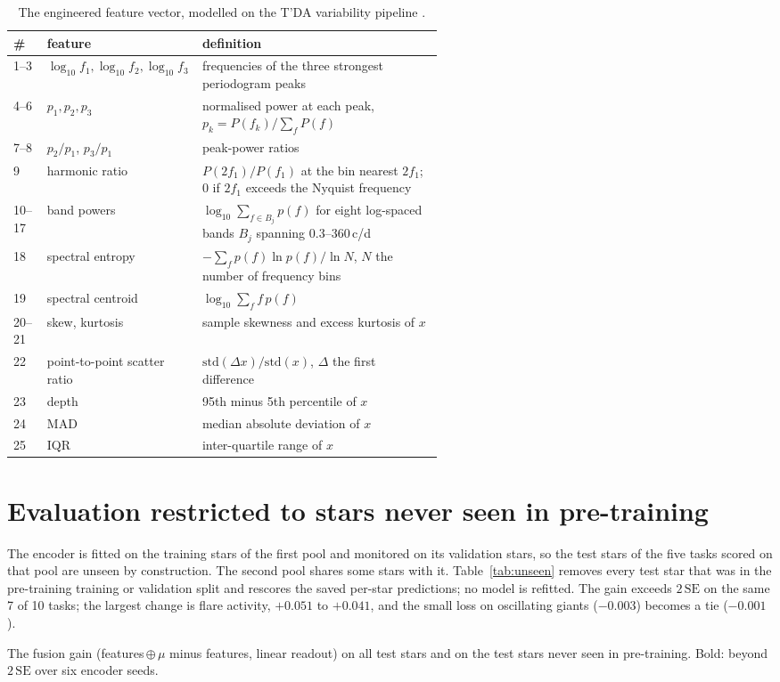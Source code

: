 \documentclass{article}
\begin{document}
\begin{table}[H]
\caption{The engineered feature vector, modelled on the T'DA variability pipeline \citep{audenaert2021}.}
\label{tab:features}
\centering
\small
\begin{tabular}{llp{0.56\linewidth}}
\toprule
\# & feature & definition \\
\midrule
1--3 & $\log_{10} f_{1}, \log_{10} f_{2}, \log_{10} f_{3}$ & frequencies of the three strongest periodogram peaks \\
4--6 & $p_{1}, p_{2}, p_{3}$ & normalised power at each peak, $p_{k} = P(f_{k})/\sum_f P(f)$ \\
7--8 & $p_{2}/p_{1}$, $p_{3}/p_{1}$ & peak-power ratios \\
9 & harmonic ratio & $P(2f_{1})/P(f_{1})$ at the bin nearest $2f_{1}$; $0$ if $2f_{1}$ exceeds the Nyquist frequency \\
10--17 & band powers & $\log_{10} \sum_{f \in B_{j}} p(f)$ for eight log-spaced bands $B_{j}$ spanning 0.3--360\,c/d \\
18 & spectral entropy & $-\sum_f p(f)\ln p(f) / \ln N$, $N$ the number of frequency bins \\
19 & spectral centroid & $\log_{10} \sum_f f\,p(f)$ \\
20--21 & skew, kurtosis & sample skewness and excess kurtosis of $x$ \\
22 & point-to-point scatter ratio & $\mathrm{std}(\Delta x)/\mathrm{std}(x)$, $\Delta$ the first difference \\
23 & depth & 95th minus 5th percentile of $x$ \\
24 & MAD & median absolute deviation of $x$ \\
25 & IQR & inter-quartile range of $x$ \\
\bottomrule
\end{tabular}
\end{table}

\section{Evaluation restricted to stars never seen in pre-training}
\label{app:unseen}

The encoder is fitted on the training stars of the first pool and monitored on its validation stars,
so the test stars of
the five tasks scored on that pool are unseen by construction. The second pool shares some stars with
it. Table~\ref{tab:unseen} removes every test star that was in the pre-training training or validation
split and rescores the saved per-star predictions; no model is refitted. The gain exceeds
$2\,\mathrm{SE}$ on the same 7 of 10 tasks; the largest change is flare activity, $+0.051$ to
$+0.041$, and the small loss on oscillating giants ($-0.003$) becomes a tie ($-0.001$).

\begin{table}[H]
\caption{The fusion gain (features\,$\oplus\,\mu$ minus features, linear readout) on all test stars and
on the test stars never seen in pre-training. Bold: beyond $2\,\mathrm{SE}$ over six encoder seeds.}
\label{tab:unseen}
\centering
\scriptsize

\end{table}
\end{document}
